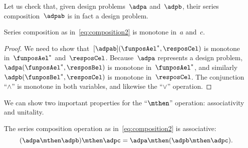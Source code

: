 Let us check that, given design problems~$\adpa$ and~$\adpb$, their series composition~$\adpab$ is in fact a design problem.
\begin{lemma}
  Series composition as in~\cref{eq:composition2} is monotone in~$a$ and~$c$.
\end{lemma}
\begin{proof}
  We need to show that~$[\adpab](\funposAel^*,\resposCel)$ is monotone in~$\funposAel^*$ and~$\resposCel$.
  Because~$\adpa$ represents a design problem,~$\adpa(\funposAel^*,\resposBel)$ is monotone in~$\funposAel^*$, and similarly~$\adpb(\funposBel^*,\resposCel)$ is monotone in~$\resposCel$.
  The conjunction ``$\wedge$'' is monotone in both variables, and likewise the ``$\vee$'' operation.
\end{proof}

We can show two important properties for the ``$\mthen$'' operation: associativity and unitality.
\begin{lemma}
  The series composition operation as in~\cref{eq:composition2} is associative:
  \begin{equation}
  (\adpa\mthen \adpb)
    \mthen \adpc = \adpa\mthen (\adpb\mthen \adpc).
  \end{equation}
\end{lemma}


